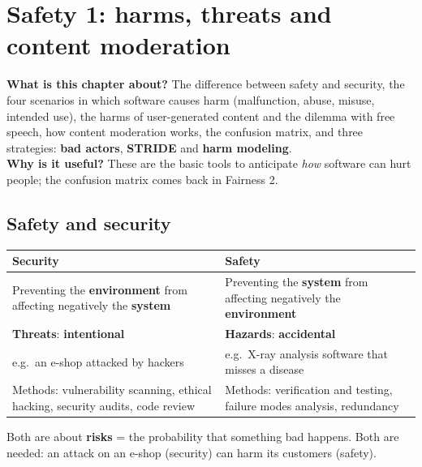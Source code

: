 \documentclass[11pt,a4paper,openany]{book}
\begin{document}
\chapter{Safety 1: harms, threats and content moderation}

\begin{rembox}[title={In a nutshell}]
\textbf{What is this chapter about?} The difference between safety and security, the four
scenarios in which software causes harm (malfunction, abuse, misuse, intended use), the harms of
user-generated content and the dilemma with free speech, how content moderation works, the
confusion matrix, and three strategies: \textbf{bad actors}, \textbf{STRIDE} and \textbf{harm
modeling}. \\
\textbf{Why is it useful?} These are the basic tools to anticipate \emph{how} software can hurt
people; the confusion matrix comes back in Fairness 2.
\end{rembox}


\section{Safety and security}

\begin{defnbox}[title={Security vs.\ safety (Leveson, 1986)}]
\begin{center}
\begin{tabularx}{\linewidth}{X|X}
\textbf{Security} & \textbf{Safety} \\ \hline
Preventing the \textbf{environment} from affecting negatively the \textbf{system} &
Preventing the \textbf{system} from affecting negatively the \textbf{environment} \\
\textbf{Threats}: \textbf{intentional} & \textbf{Hazards}: \textbf{accidental} \\
e.g.\ an e-shop attacked by hackers & e.g.\ X-ray analysis software that misses a disease \\
Methods: vulnerability scanning, ethical hacking, security audits, code review &
Methods: verification and testing, failure modes analysis, redundancy
\end{tabularx}
\end{center}
Both are about \textbf{risks} = the probability that something bad happens. Both are needed:
an attack on an e-shop (security) can harm its customers (safety).
\end{defnbox}
\end{document}
